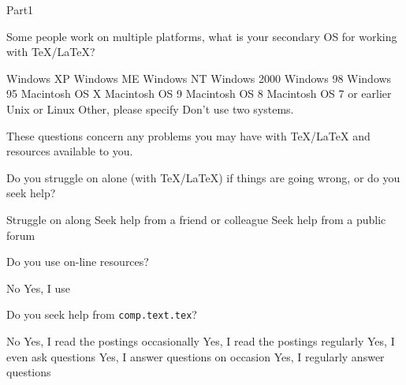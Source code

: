 \documentclass{article}
\begin{document}
\begin{exam}{Part1}
\begin{problem*}
\begin{parts}
\item Some people work on multiple platforms, what is your secondary
OS for working with \TeX/\LaTeX?
\begin{multicols}{2}
\begin{answers}{1}
\bChoices
      Windows XP\eAns
      Windows ME\eAns
      Windows NT\eAns
      Windows 2000\eAns
      Windows 98\eAns
      Windows 95\eAns
      Macintosh OS X\eAns
      Macintosh OS 9\eAns
      Macintosh OS 8\eAns
      Macintosh OS 7 or earlier\eAns
      Unix or Linux\eAns
      Other, please specify \fillin{1.25in}{\empty}\eAns
      Don't use two systems.\eAns
\eChoices
\end{answers}
\end{multicols}

\end{parts}

\end{problem*}


\begin{eqComments}\end{eqComments}

\begin{problem*}
These questions concern any problems you may have with \TeX/\LaTeX{} and resources available to you.
\begin{parts}
\item  Do you struggle on alone (with \TeX/\LaTeX ) if things are going wrong, or do you
  seek help?
  \begin{answers}{3}
    \bChoices
         Struggle on along\eAns
         Seek help from a friend or colleague\eAns
         Seek help from a public forum\eAns
    \eChoices
  \end{answers}

\item Do you use on-line resources?
  \begin{answers}{4}
    \bChoices
         No\eAns
         Yes, I use \makebox[0pt][l]{\fillin{1.75in}{\empty}}\eAns
    \eChoices
  \end{answers}

\goodbreak

\item Do you seek help from \texttt{comp.text.tex}?
  \begin{answers}{3}
    \bChoices
         No\eAns
         Yes, I read the postings occasionally\eAns
         Yes, I read the postings regularly\eAns
         Yes, I even ask questions\eAns
         Yes, I answer questions on occasion\eAns
         Yes, I regularly answer questions\eAns
    \eChoices
  \end{answers}
\end{parts}
\end{problem*}


\end{exam}
\end{document}
